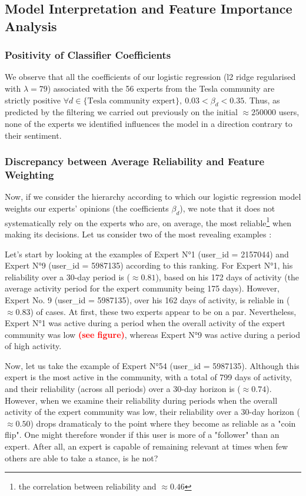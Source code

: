 \documentclass{article}
\begin{document}
\subsection{Model Interpretation and Feature Importance Analysis}
\subsubsection{Positivity of Classifier Coefficients}
We observe that all the coefficients of our logistic regression (l2 ridge regularised with $\lambda = 79$) associated with the 56 experts from the Tesla community are strictly positive $\forall d\in \{\text{Tesla community expert}\},\: 0.03<\beta_d<0.35$. Thus, as predicted by the filtering we carried out previously on the initial $\approx 250000$ users, none of the experts we identified influences the model in a direction contrary to their sentiment.

\subsubsection{Discrepancy between Average Reliability and Feature Weighting}
Now, if we consider the hierarchy according to which our logistic regression model weights our experts’ opinions (the coefficients $\beta_d$), we note that it does not systematically rely on the experts who are, on average, the most reliable\footnote{the correlation between reliability and $\approx 0.46$} when making its decisions. Let us consider two of the most revealing examples :

Let’s start by looking at the examples of Expert N°1 (user\_id = 2157044) and Expert N°9 (user\_id = 5987135) according to this ranking. For Expert N°1, his reliability over a 30-day period is ($\approx 0.81$), based on his 172 days of activity (the average activity period for the expert community being 175 days). However, Expert No. 9 (user\_id = 5987135), over his 162 days of activity, is reliable in ($\approx 0.83$) of cases. At first, these two experts appear to be on a par. Nevertheless, Expert N°1 was active during a period when the overall activity of the expert community was low \textcolor{red}{\textbf{(see figure)}}, whereas Expert N°9 was active during a period of high activity.

Now, let us take the example of Expert N°54 (user\_id = 5987135). Although this expert is the most active in the community, with a total of 799 days of activity, and their reliability (across all periods) over a 30-day horizon is ($\approx 0.74$). However, when we examine their reliability during periods when the overall activity of the expert community was low, their reliability over a 30-day horizon ($\approx 0.50$) drops dramaticaly to the point where they become as reliable as a "coin flip". One might therefore wonder if this user is more of a "follower" than an expert. After all, an expert is capable of remaining relevant at times when few others are able to take a stance, is he not?
\end{document}
